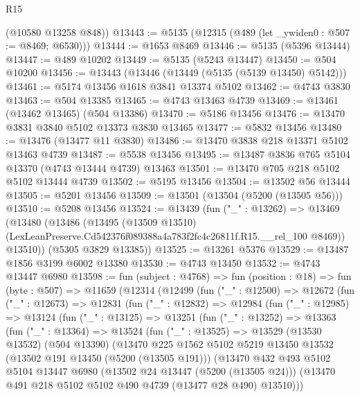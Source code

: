 \begin{lexlean}{R15}
\begin{coremodule}
{{{{{{{{{{{      (@10580 @13258 @848))
@13443 := @5135 (@12315 (@489 (let _ywiden0 : @507 := @8469; @6530)))
@13444 := @1653 @8469
@13446 := @5135 (@5396 @13444)
@13447 := @489 @10202
@13449 := @5135 (@5243 @13447)
@13450 := @504 @10200
@13456 := @13443 (@13446 (@13449 (@5135 (@5139 @13450) @5142)))
@13461 := @5174 @13456 @1618 @3841 @13374 @5102
@13462 := @4743 @3830
@13463 := @504 @13385
@13465 := @4743 @13463 @4739
@13469 := @13461 (@13462 @13465) (@504 @13386)
@13470 := @5186 @13456
@13476 := @13470 @3831 @3840 @5102 @13373 @3830 @13465
@13477 := @5832 @13456
@13480 := @13476 (@13477 @11 @3830)
@13486 := @13470 @3838 @218 @13371 @5102 @13463 @4739
@13487 := @5538 @13456
@13495 := @13487 @3836 @765 @5104 @13370 (@4743 @13444 @4739) @13463
@13501 := @13470 @705 @218 @5102 @5102 @13444 @4739
@13502 := @5195 @13456
@13504 := @13502 @56 @13444
@13505 := @5201 @13456
@13509 := @13501 (@13504 (@5200 (@13505 @56)))
@13510 := @5208 @13456
@13524 := @13439
    (fun ("_" : @13262) =>
    @13469
      (@13480
        (@13486
          (@13495
            (@13509 @13510)
            (LexLeanPreserve.Cd542376f089388a4a783f2fc4c26811f.R15.__rel_100 @8469))
          @13510))
      (@5305 @3829 @13385))
@13525 := @13261 @5376
@13529 := @13487 @1856 @3199 @6002 @13380
@13530 := @4743 @13450
@13532 := @4743 @13447 @6980
@13598 := fun (subject : @4768) =>
  fun (position : @18) =>
  fun (byte : @507) =>
  @11659
    (@12314
      (@12499
        (fun ("_" : @12500) =>
        @12672
          (fun ("_" : @12673) =>
          @12831
            (fun ("_" : @12832) =>
            @12984
              (fun ("_" : @12985) =>
              @13124
                (fun ("_" : @13125) =>
                @13251
                  (fun ("_" : @13252) =>
                  @13363
                    (fun ("_" : @13364) =>
                    @13524
                      (fun ("_" : @13525) =>
                      @13529
                        (@13530 @13532)
                        (@504 @13390)
                        (@13470
                          @225
                          @1562
                          @5102
                          @5219
                          @13450
                          @13532
                          (@13502 @191 @13450 (@5200 (@13505 @191)))
                          (@13470
                            @432
                            @493
                            @5102
                            @5104
                            @13447
                            @6980
                            (@13502 @24 @13447 (@5200 (@13505 @24)))
                            (@13470 @491 @218 @5102 @5102 @490 @4739 (@13477 @28 @490) @13510)))
}}}}}}}}}}}
\end{coremodule}
\end{lexlean}
